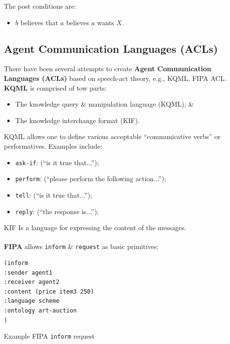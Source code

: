 \documentclass[a4paper,11pt]{article}
\newenvironment{code}{\captionsetup{type=listing}}{}
\begin{document}
The post conditions are:
\begin{itemize}
    \item   $b$ believes that $a$ believes $a$ wants $X$.
\end{itemize}

\subsection{Agent Communication Languages (ACLs)}
There have been several attempts to create \textbf{Agent Communication Languages (ACLs)} based on speech-act theory, e.g., KQML, FIPA ACL.
\textbf{KQML} is comprised of tow parts:
\begin{itemize}
    \item   The knowledge query \& manipulation language (KQML); \& 
    \item   The knowledge interchange format (KIF).
\end{itemize}

KQML allows one to define various acceptable ``communicative verbs'' or performatives.
Examples include:
\begin{itemize}
    \item   \verb|ask-if|: (``is it true that...'');
    \item   \verb|perform|: (``please perform the following action...'');
    \item   \verb|tell|: (``is it true that...'');
    \item   \verb|reply|: (``the response is...'');
\end{itemize}

KIF Is a language for expressing the content of the messages.
\\\\
\textbf{FIPA} allows \verb|inform| \& \verb|request| as basic primitives:

\begin{code}
\begin{verbatim}
(inform
:sender agent1
:receiver agent2
:content (price item3 250)
:language scheme
:ontology art-auction
)
\end{verbatim}
\caption{Example FIPA \texttt{inform} request} \end{code}
\end{document}

